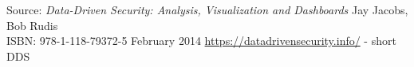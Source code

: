 \documentclass[Screen16to9,17pt]{foils}
\begin{document}
Source: \emph{Data-Driven Security: Analysis, Visualization and Dashboards} Jay Jacobs, Bob Rudis\\
ISBN: 978-1-118-79372-5 February 2014 \url{https://datadrivensecurity.info/} - short DDS



\slidenext{}
\end{document}
